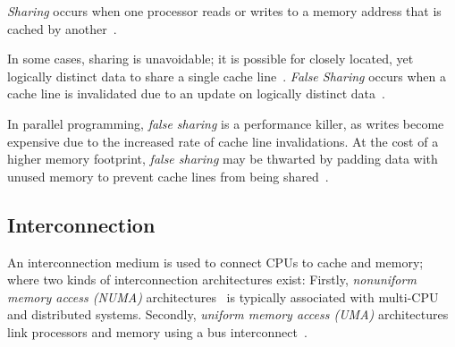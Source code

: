 \emph{Sharing} occurs when one processor reads or writes to a memory address that
is cached by another~\citep[Appendix~B.5.1]{herlihy2020art}.


In some cases, sharing is unavoidable; it is possible for closely located, yet
logically distinct data to share a single cache line~\citep[Appendix~B.5.1]{herlihy2020art}. \emph{False Sharing} occurs when
a cache line is invalidated due to an update on logically distinct data~\citep[Appendix~B.5.1]{herlihy2020art}. 

In parallel programming, \emph{false sharing} is a
performance killer, as writes become expensive due to the increased rate of
cache line invalidations. At the cost of a higher memory footprint, \emph{false
sharing} may be thwarted by padding data with unused memory to prevent cache
lines from being shared~\citep{scott2013shared}.

\subsection{Interconnection}

An interconnection medium is used to connect CPUs to cache and memory; where
two kinds of interconnection architectures exist: Firstly,
\emph{nonuniform memory access (NUMA)}
architectures~\citep[Appendix~B.3]{herlihy2020art} is typically associated with
multi-CPU and distributed systems. Secondly, \emph{uniform memory
access (UMA)} architectures link processors and memory using a bus
interconnect~\citep[Appendix~B.3]{herlihy2020art}.

